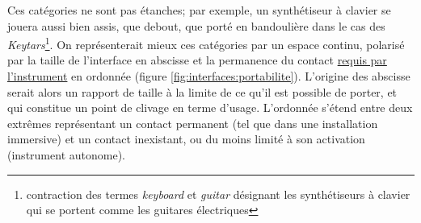 \par
\noindent Ces catégories ne sont pas étanches; par exemple, un synthétiseur à clavier se jouera aussi bien assis, que debout, que porté en bandoulière dans le cas des \textit{Keytars}\footnote{contraction des termes \textit{keyboard} et \textit{guitar} désignant les synthétiseurs à clavier qui se portent comme les guitares électriques}. On représenterait mieux ces catégories par un espace continu, polarisé par la taille de l'interface en abscisse et la permanence du contact \underline{requis par l'instrument} en ordonnée (figure \ref{fig:interfaces:portabilite}). L'origine des abscisse serait alors un rapport de taille à la limite de ce qu'il est possible de porter, et qui constitue un point de clivage en terme d'usage. L'ordonnée s'étend entre deux extrêmes représentant un contact permanent (tel que dans une installation immersive) et un contact inexistant, ou du moins limité à son activation (instrument autonome).







